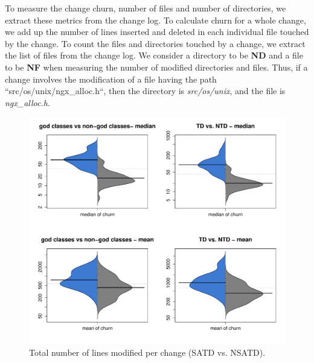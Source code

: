 To measure the change churn, number of files and number of directories, we extract these metrics from the change log. To calculate churn for a whole change, we add up the number of lines inserted and deleted in each individual file touched by the change. To count the files and directories touched by a change, we extract the list of files from the change log. We consider a directory to be \textbf{ND} and a file to be \textbf{NF} when measuring the number of modified directories and files. Thus, if a change involves the modification of a file having the path ``src/os/unix/ngx\_alloc.h``, then the directory is \textit{src/os/unix}, and the file is \textit{ngx\_alloc.h}.\\



\begin{figure}[tb!]
	\centering
	\includegraphics[width=120mm]{figures/chapter4/rq3_distribution_of_churn}
	\caption{Total number of lines modified per change (SATD vs. NSATD).}
	\label{figure:ch4_tlcpc}
\end{figure}



